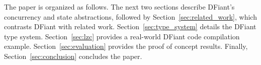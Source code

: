 The paper is organized as follows. The next two sections describe DFiant's concurrency and state abstractions, followed by Section~\ref{sec:related_work}, which contrasts DFiant with related work. 
Section~\ref{sec:type_system} details the DFiant type system.
Section~\ref{sec:lzc} provides a real-world DFiant code compilation example.
Section~\ref{sec:evaluation} provides the proof of concept results.
Finally, Section~\ref{sec:conclusion} concludes the paper.




 





